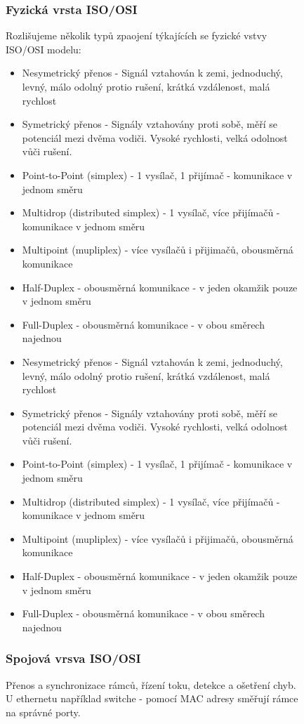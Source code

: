 \begin{figure}[h]
\subsubsection*{Fyzická vrsta ISO/OSI}
Rozlišujeme několik typů zpaojení týkajících se fyzické vstvy ISO/OSI modelu:
\begin{itemize}
  \item Nesymetrický přenos - Signál vztahován k zemi, jednoduchý, levný, málo odolný protio rušení, krátká vzdálenost, malá rychlost
  \item Symetrický přenos - Signály vztahovány proti sobě, měří se potenciál mezi dvěma vodiči. Vysoké rychlosti, velká odolnost vůči rušení.
  \item Point-to-Point (simplex) - 1 vysílač, 1 přijímač - komunikace v jednom směru
  \item Multidrop (distributed simplex) - 1 vysílač, více přijímačů - komunikace v jednom směru
  \item Multipoint (mupliplex) - více vysílačů i přijimačů, obousměrná komunikace
  \item Half-Duplex - obousměrná komunikace - v jeden okamžik pouze v jednom směru
  \item Full-Duplex - obousměrná komunikace - v obou směrech najednou
    \item Nesymetrický přenos - Signál vztahován k zemi, jednoduchý, levný, málo odolný protio rušení, krátká vzdálenost, malá rychlost
    \item Symetrický přenos - Signály vztahovány proti sobě, měří se potenciál mezi dvěma vodiči. Vysoké rychlosti, velká odolnost vůči rušení.
    \item Point-to-Point (simplex) - 1 vysílač, 1 přijímač - komunikace v jednom směru
    \item Multidrop (distributed simplex) - 1 vysílač, více přijímačů - komunikace v jednom směru
    \item Multipoint (mupliplex) - více vysílačů i přijimačů, obousměrná komunikace
    \item Half-Duplex - obousměrná komunikace - v jeden okamžik pouze v jednom směru
    \item Full-Duplex - obousměrná komunikace - v obou směrech najednou
\end{itemize}

\subsubsection*{Spojová vrsva ISO/OSI}
Přenos a synchronizace rámců, řízení toku, detekce a ošetření chyb. U ethernetu například switche - pomocí MAC adresy směřují rámce na správné porty.


\end{figure}
